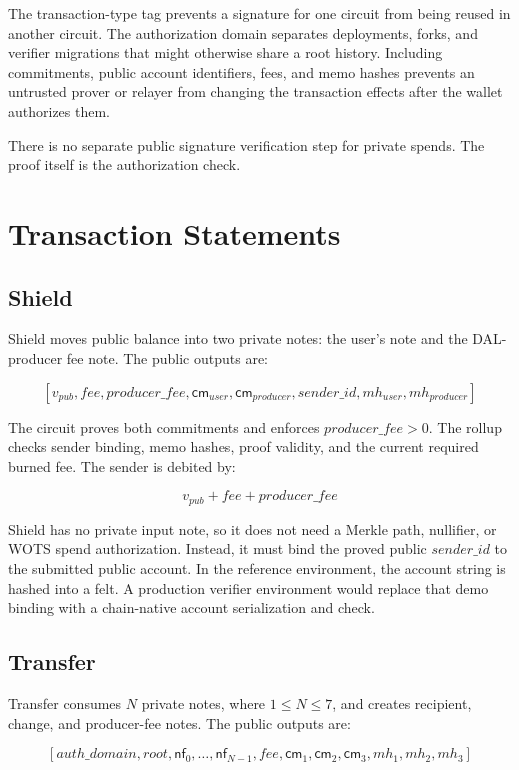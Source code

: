 \documentclass[11pt]{article}
\newcommand{\cm}{\mathsf{cm}}
\newcommand{\nf}{\mathsf{nf}}
\begin{document}
The transaction-type tag prevents a signature for one circuit from being reused
in another circuit. The authorization domain separates deployments, forks, and
verifier migrations that might otherwise share a root history. Including
commitments, public account identifiers, fees, and memo hashes prevents an
untrusted prover or relayer from changing the transaction effects after the
wallet authorizes them.

There is no separate public signature verification step for private spends.
The proof itself is the authorization check.

\section{Transaction Statements}

\subsection{Shield}

Shield moves public balance into two private notes: the user's note and the
DAL-producer fee note. The public outputs are:

\[
[v_{pub}, fee, producer\_fee, \cm_{user}, \cm_{producer},
sender\_id, mh_{user}, mh_{producer}]
\]

The circuit proves both commitments and enforces \(producer\_fee > 0\). The
rollup checks sender binding, memo hashes, proof validity, and the current
required burned fee. The sender is debited by:

\[
v_{pub} + fee + producer\_fee
\]

Shield has no private input note, so it does not need a Merkle path, nullifier,
or WOTS spend authorization. Instead, it must bind the proved public
\(sender\_id\) to the submitted public account. In the reference environment,
the account string is hashed into a felt. A production verifier environment
would replace that demo binding with a chain-native account serialization and
check.

\subsection{Transfer}

Transfer consumes \(N\) private notes, where \(1 \leq N \leq 7\), and creates
recipient, change, and producer-fee notes. The public outputs are:

\[
[auth\_domain, root, \nf_0,\ldots,\nf_{N-1}, fee,
\cm_1, \cm_2, \cm_3, mh_1, mh_2, mh_3]
\]
\end{document}
